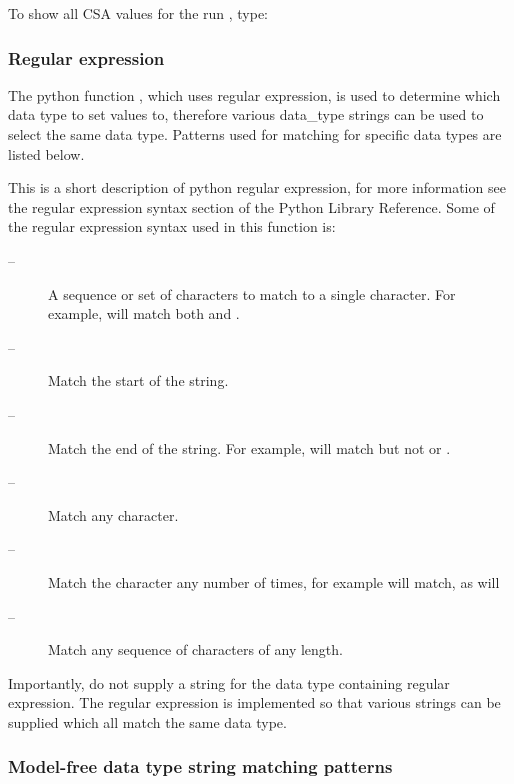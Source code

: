 To show all CSA values for the run , type:




\subsubsection{Regular expression}

The python function , which uses regular expression, is used to determine which data type to set values to, therefore various data\_type strings can be used to select the same data type.  Patterns used for matching for specific data types are listed below.


This is a short description of python regular expression, for more information see the regular expression syntax section of the Python Library Reference.  Some of the regular expression syntax used in this function is:


\begin{description}
\item[\quotecmd{[]} --]  A sequence or set of characters to match to a single character.  For example,  will match both  and . 
\item[\quotecmd{\^{}} --]  Match the start of the string. 
\item[\quotecmd{\$} --]  Match the end of the string.  For example,  will match  but not  or . 
\item[ --]  Match any character. 
\item[ --]  Match the character  any number of times, for example  will match, as will  
\item[ --]  Match any sequence of characters of any length. 
\end{description}


Importantly, do not supply a string for the data type containing regular expression.  The regular expression is implemented so that various strings can be supplied which all match the same data type.



\subsubsection{Model-free data type string matching patterns}

